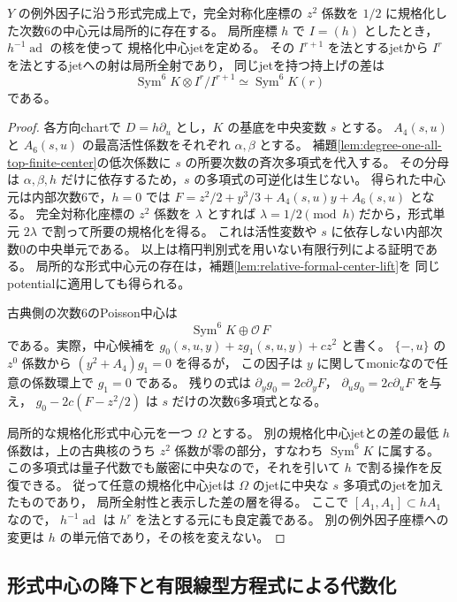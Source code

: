 \begin{lemma}[規格化中心jetの局所持上げ]
\label{lem:degree-one-normalized-center-jets}
$Y$ の例外因子に沿う形式完成上で，完全対称化座標の
$z^2$ 係数を $1/2$ に規格化した次数6の中心元は局所的に存在する。
局所座標 $h$ で $I=(h)$ としたとき，$h^{-1}\operatorname{ad}$ の核を使って
規格化中心jetを定める。
その $I^{r+1}$ を法とするjetから $I^r$ を法とするjetへの射は局所全射であり，
同じjetを持つ持上げの差は
\[
 \operatorname{Sym}^6K\otimes I^r/I^{r+1}
        \simeq\operatorname{Sym}^6K(r)
\]
である。
\end{lemma}
\begin{proof}
各方向chartで $D=h\partial_u$ とし，$K$ の基底を中央変数 $s$ とする。
$A_4(s,u)$ と $A_6(s,u)$ の最高活性係数をそれぞれ $\alpha,\beta$ とする。
補題\ref{lem:degree-one-all-top-finite-center}の低次係数に
$s$ の所要次数の斉次多項式を代入する。
その分母は $\alpha,\beta,h$ だけに依存するため，$s$ の多項式の可逆化は生じない。
得られた中心元は内部次数6で，$h=0$ では
$F=z^2/2+y^3/3+A_4(s,u)y+A_6(s,u)$ となる。
完全対称化座標の $z^2$ 係数を $\lambda$ とすれば
$\lambda=1/2\pmod h$ だから，形式単元 $2\lambda$ で割って所要の規格化を得る。
これは活性変数や $s$ に依存しない内部次数0の中央単元である。
以上は楕円判別式を用いない有限行列による証明である。
局所的な形式中心元の存在は，補題\ref{lem:relative-formal-center-lift}を
同じpotentialに適用しても得られる。

古典側の次数6のPoisson中心は
\[
 \operatorname{Sym}^6K\oplus\mathcal O\,F
\]
である。実際，中心候補を $g_0(s,u,y)+zg_1(s,u,y)+cz^2$ と書く。
$\{-,u\}$ の $z^0$ 係数から $(y^2+A_4)g_1=0$ を得るが，
この因子は $y$ に関してmonicなので任意の係数環上で $g_1=0$ である。
残りの式は $\partial_y g_0=2c\partial_yF$，
$\partial_u g_0=2c\partial_uF$ を与え，
$g_0-2c(F-z^2/2)$ は $s$ だけの次数6多項式となる。

局所的な規格化形式中心元を一つ $\Omega$ とする。
別の規格化中心jetとの差の最低 $h$ 係数は，上の古典核のうち
$z^2$ 係数が零の部分，すなわち $\operatorname{Sym}^6K$ に属する。
この多項式は量子代数でも厳密に中央なので，それを引いて $h$ で割る操作を反復できる。
従って任意の規格化中心jetは $\Omega$ のjetに中央な $s$ 多項式のjetを加えたものであり，
局所全射性と表示した差の層を得る。
ここで $[A_1,A_1]\subset hA_1$ なので，
$h^{-1}\operatorname{ad}$ は $h^r$ を法とする元にも良定義である。
別の例外因子座標への変更は $h$ の単元倍であり，その核を変えない。
\end{proof}

\subsection{形式中心の降下と有限線型方程式による代数化}

